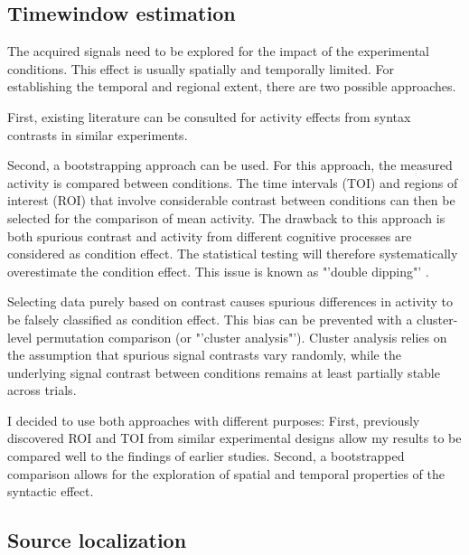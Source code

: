\subsection{Timewindow estimation}
The acquired signals need to be explored for the impact of the experimental conditions.
This effect is usually spatially and temporally limited.
For establishing the temporal and regional extent, there are two possible approaches.

First, existing literature can be consulted for activity effects from syntax contrasts in similar experiments.

Second, a bootstrapping approach can be used.
For this approach, the measured activity is compared between conditions.
The time intervals (TOI) and regions of interest (ROI) that involve considerable contrast between conditions can then be selected for the comparison of mean activity.
The drawback to this approach is both spurious contrast and activity from different cognitive processes are considered as condition effect.
The statistical testing will therefore systematically overestimate the condition effect.
This issue is known as "'double dipping"' \cite{1.5.Kriegeskorte}.

Selecting data purely based on contrast causes spurious differences in activity to be falsely classified as condition effect.
This bias can be prevented with a cluster-level permutation comparison (or "'cluster analysis"').
Cluster analysis relies on the assumption that spurious signal contrasts vary randomly, while the underlying signal contrast between conditions remains at least partially stable across trials.

I decided to use both approaches with different purposes:
First, previously discovered ROI and TOI from similar experimental designs allow my results to be compared well to the findings of earlier studies.
Second, a bootstrapped comparison allows for the exploration of spatial and temporal properties of the syntactic effect.

\subsection{Source localization}


